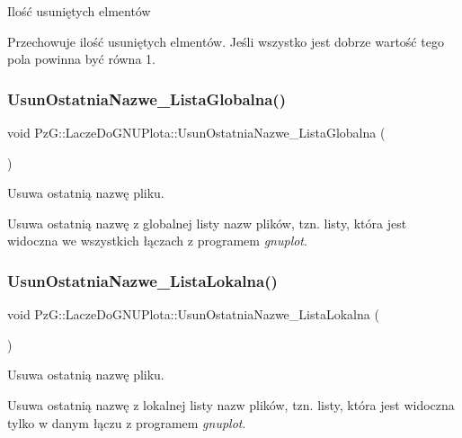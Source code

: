 Ilość usuniętych elmentów

Przechowuje ilość usuniętych elmentów. Jeśli wszystko jest dobrze wartość tego pola powinna być równa 1.\mbox{\label{class_pz_g_1_1_lacze_do_g_n_u_plota_ac9b77a032e256c3143b984509a8b4bb5}} 
\subsubsection{\texorpdfstring{UsunOstatniaNazwe\_ListaGlobalna()}{UsunOstatniaNazwe\_ListaGlobalna()}}
{\footnotesize\ttfamily void Pz\+G\+::\+Lacze\+Do\+G\+N\+U\+Plota\+::\+Usun\+Ostatnia\+Nazwe\+\_\+\+Lista\+Globalna (\begin{DoxyParamCaption}{ }\end{DoxyParamCaption})}



Usuwa ostatnią nazwę pliku. 

Usuwa ostatnią nazwę z globalnej listy nazw plików, tzn. listy, która jest widoczna we wszystkich łączach z programem {\itshape gnuplot}. \mbox{\label{class_pz_g_1_1_lacze_do_g_n_u_plota_a263a9dba2ef8030028a48217a183ecdf}} 
\subsubsection{\texorpdfstring{UsunOstatniaNazwe\_ListaLokalna()}{UsunOstatniaNazwe\_ListaLokalna()}}
{\footnotesize\ttfamily void Pz\+G\+::\+Lacze\+Do\+G\+N\+U\+Plota\+::\+Usun\+Ostatnia\+Nazwe\+\_\+\+Lista\+Lokalna (\begin{DoxyParamCaption}{ }\end{DoxyParamCaption})}



Usuwa ostatnią nazwę pliku. 

Usuwa ostatnią nazwę z lokalnej listy nazw plików, tzn. listy, która jest widoczna tylko w danym łączu z programem {\itshape gnuplot}. \mbox{\label{class_pz_g_1_1_lacze_do_g_n_u_plota_a89a1d90d017d264cd26398464d074073}} 
